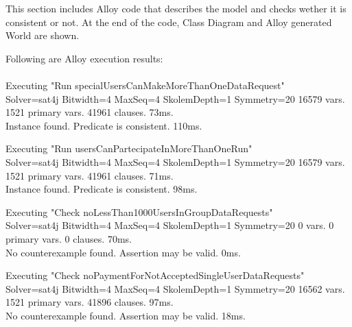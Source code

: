This section includes Alloy code that describes the model and checks wether it is consistent or not.
At the end of the code, Class Diagram and Alloy generated World are shown.



\vfill

\vspace{1cm}

Following are Alloy execution results: \\ \\

   Executing "Run specialUsersCanMakeMoreThanOneDataRequest" \\ \noindent
      Solver=sat4j Bitwidth=4 MaxSeq=4 SkolemDepth=1 Symmetry=20
      16579 vars. 1521 primary vars. 41961 clauses. 73ms. \\ \noindent
      Instance found. Predicate is consistent. 110ms.

   \vspace{1cm}

   Executing "Run usersCanPartecipateInMoreThanOneRun" \\ \noindent
      Solver=sat4j Bitwidth=4 MaxSeq=4 SkolemDepth=1 Symmetry=20
      16579 vars. 1521 primary vars. 41961 clauses. 71ms. \\ \noindent
      Instance found. Predicate is consistent. 98ms.

   \vspace{1cm}

   Executing "Check noLessThan1000UsersInGroupDataRequests" \\ \noindent
      Solver=sat4j Bitwidth=4 MaxSeq=4 SkolemDepth=1 Symmetry=20
      0 vars. 0 primary vars. 0 clauses. 70ms. \\ \noindent
      No counterexample found. Assertion may be valid. 0ms.

   \vspace{1cm}

   Executing "Check noPaymentForNotAcceptedSingleUserDataRequests" \\ \noindent
      Solver=sat4j Bitwidth=4 MaxSeq=4 SkolemDepth=1 Symmetry=20
      16562 vars. 1521 primary vars. 41896 clauses. 97ms. \\ \noindent
      No counterexample found. Assertion may be valid. 18ms.

